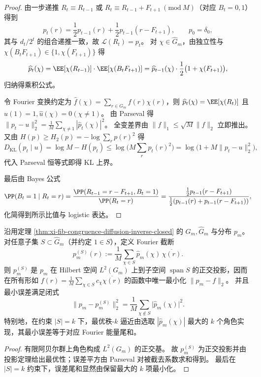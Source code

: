 \begin{proof}
由一步递推 \(R_t\equiv R_{t-1}\) 或 \(R_t\equiv R_{t-1}+F_{t+1}\ (\mathrm{mod}\ M)\)（对应 \(B_t=0,1\)）得到
\[
p_t(r)=\frac12p_{t-1}(r)+\frac12p_{t-1}(r-F_{t+1}),
\qquad p_0=\delta_0,
\]
其与 \(d_t/2^t\) 的组合递推一致，故 \(\mathcal L(R_t)=p_t\)。
对 \(\chi\in\widehat G_m\)，由独立性与 \(\chi(B_tF_{t+1})\in\{1,\chi(F_{t+1})\}\) 得
\[
\widehat p_t(\chi)=\EE[\chi(R_{t-1})]\cdot \EE[\chi(B_tF_{t+1})]
=\widehat p_{t-1}(\chi)\cdot \frac12\bigl(1+\chi(F_{t+1})\bigr),
\]
归纳得乘积公式。
\par
令 Fourier 变换约定为 \(\widehat f(\chi)=\sum_{r\in G_m}f(r)\chi(r)\)，则 \(\widehat p_t(\chi)=\EE[\chi(R_t)]\) 且 \(\widehat u(1)=1,\widehat u(\chi)=0(\chi\neq 1)\)。
由 Parseval 得
\(
\|p_t-u\|_2^2=\frac1M\sum_{\chi\neq 1}|\widehat p_t(\chi)|^2
\)。
全变差界由 \(\|f\|_1\le \sqrt{M}\|f\|_2\) 立即推出。
又由 \(H(p)\ge H_2(p)=-\log\sum_r p(r)^2\) 得
\[
D_{\mathrm{KL}}(p_t\mid u)=\log M-H(p_t)\le \log\!\bigl(M\sum_r p_t(r)^2\bigr)
=\log\!\bigl(1+M\|p_t-u\|_2^2\bigr),
\]
代入 Parseval 恒等式即得 KL 上界。
\par
最后由 Bayes 公式
\[
\PP(B_t=1\mid R_t=r)
=\frac{\PP(R_{t-1}=r-F_{t+1},B_t=1)}{\PP(R_t=r)}
=\frac{\frac12p_{t-1}(r-F_{t+1})}{\frac12(p_{t-1}(r)+p_{t-1}(r-F_{t+1}))},
\]
化简得到所示比值与 logistic 表达。
\end{proof}

\begin{proposition}[角色截断投影的最优秩逼近与误差尾能量闭式]\label{prop:xi-fib-congruence-fourier-rankk-optimal}
沿用定理 \ref{thm:xi-fib-congruence-diffusion-inverse-closed} 的 \(G_m,\widehat G_m\) 与分布 \(p_m\)。
对任意子集 \(S\subset\widehat G_m\)（并约定 \(1\in S\)），定义 Fourier 截断
\[
p_m^{(S)}(r):=\frac1M\sum_{\chi\in S}\widehat p_m(\chi)\,\overline{\chi(r)}.
\]
则 \(p_m^{(S)}\) 是 \(p_m\) 在 Hilbert 空间 \(L^2(G_m)\) 上到子空间 \(\operatorname{span}S\) 的正交投影，因而在所有形如
\(
f(r)=\frac1M\sum_{\chi\in S}c_\chi\overline{\chi(r)}
\)
的函数中唯一最小化 \(\|p_m-f\|_2\)。
并且最小误差满足闭式
\[
\|p_m-p_m^{(S)}\|_2^2=\frac1M\sum_{\chi\notin S}\bigl|\widehat p_m(\chi)\bigr|^2.
\]
特别地，在约束 \(|S|=k\) 下，最优秩-\(k\) 逼近由选取 \(|\widehat p_m(\chi)|\) 最大的 \(k\) 个角色实现，其最小误差等于对应 Fourier 能量尾和。
\end{proposition}
\begin{proof}
有限阿贝尔群上角色构成 \(L^2(G_m)\) 的正交基。
故 \(p_m^{(S)}\) 为正交投影并由投影定理给出最优性；误差平方由 Parseval 对被截去系数求和得到。
最后在 \(|S|=k\) 约束下，误差尾和显然由保留最大的 \(k\) 项最小化。
\end{proof}

